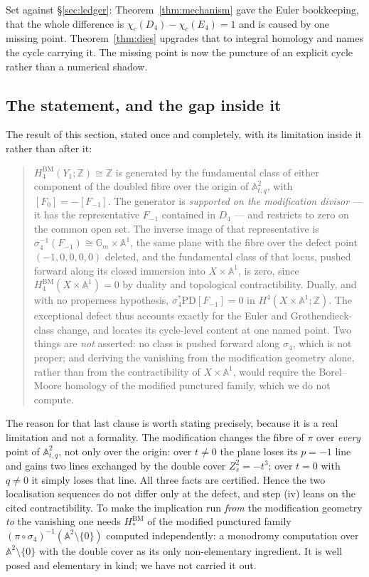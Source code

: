 \documentclass[11pt]{article}
\theoremstyle{definition}
\theoremstyle{remark}
\newcommand{\Z}{\mathbb{Z}}
\newcommand{\Aff}[1]{\mathbb{A}^{#1}}
\newcommand{\Gm}{\mathbb{G}_m}
\newcommand{\HBM}[1]{H^{\mathrm{BM}}_{#1}}
\newcommand{\chic}{\chi_c}
\begin{document}
Set against \S\ref{sec:ledger}: Theorem~\ref{thm:mechanism} gave the Euler
bookkeeping, that the whole difference is $\chic(D_4)-\chic(E_4)=1$ and is
caused by one missing point. Theorem~\ref{thm:dies} upgrades that to integral
homology and names the cycle carrying it. The missing point is now the
puncture of an explicit cycle rather than a numerical shadow.

\subsection{The statement, and the gap inside it}\label{sec:gap}

The result of this section, stated once and completely, with its limitation
inside it rather than after it:

\begin{quote}
$\HBM{4}(Y_1;\Z)\cong\Z$ is generated by the fundamental class of either
component of the doubled fibre over the origin of $\Aff{2}_{t,q}$, with
$[F_0]=-[F_{-1}]$. The generator is \emph{supported on the modification
divisor} --- it has the representative $F_{-1}$ contained in $D_4$ --- and
restricts to zero on the common open set. The inverse image of that
representative is $\sigma_4^{-1}(F_{-1})\cong\Gm\times\Aff{1}$, the same plane
with the fibre over the defect point $(-1,0,0,0,0)$ deleted, and the
fundamental class of that locus, pushed forward along its closed immersion
into $X\times\Aff{1}$, is zero, since $\HBM{4}(X\times\Aff{1})=0$ by duality
and topological contractibility. Dually, and with no properness hypothesis,
$\sigma_4^{*}\mathrm{PD}[F_{-1}]=0$ in $H^4(X\times\Aff{1};\Z)$. The
exceptional defect thus accounts exactly for the Euler and
Grothendieck-class change, and locates its cycle-level content at one named
point. Two things are \emph{not} asserted: no class is pushed forward along
$\sigma_4$, which is not proper; and deriving the vanishing from the
modification geometry alone, rather than from the contractibility of
$X\times\Aff{1}$, would require the Borel--Moore homology of the modified
punctured family, which we do not compute.
\end{quote}

The reason for that last clause is worth stating precisely, because it is a
real limitation and not a formality. The modification changes the fibre of
$\pi$ over \emph{every} point of $\Aff{2}_{t,q}$, not only over the origin:
over $t\ne0$ the plane loses its $p=-1$ line and gains two lines exchanged by
the double cover $Z_s^2=-t^3$; over $t=0$ with $q\ne0$ it simply loses that
line. All three facts are certified. Hence the two localisation sequences do
not differ only at the defect, and step (iv) leans on the cited
contractibility. To make the implication run \emph{from} the modification
geometry \emph{to} the vanishing one needs $\HBM{\ast}$ of the modified
punctured family $(\pi\circ\sigma_4)^{-1}(\Aff{2}\setminus\{0\})$ computed
independently: a monodromy computation over $\Aff{2}\setminus\{0\}$ with the
double cover as its only non-elementary ingredient. It is well posed and
elementary in kind; we have not carried it out.
\end{document}
